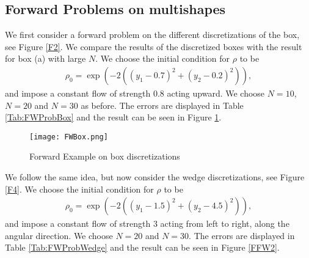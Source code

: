 \subsection*{Forward Problems on multishapes}
We first consider a forward problem on the different discretizations of the box, see Figure \ref{F2}. We compare the results of the discretized boxes with the result for box (a) with large $N$.
We choose the initial condition for $\rho$ to be
\begin{align*}
	\rho_0 = \exp(-2((y_1 - 0.7 )^2 + (y_2 - 0.2)^2)),
\end{align*}
and impose a constant flow of strength $0.8$ acting upward.
We choose $N = 10$, $N = 20$ and $N = 30$ as before. The errors are displayed in Table \ref{Tab:FWProbBox} and the result can be seen in Figure \ref{FFW1}. 
%
\begin{figure}[h]
	\centering
	\texttt{[image: FWBox.png]}
	\caption{Forward Example on box discretizations} 
	\label{FFW1}
\end{figure}


We follow the same idea, but now consider the wedge discretizations, see Figure \ref{F4}. We choose the initial condition for $\rho$ to be
\begin{align*}
	\rho_0 = \exp(-2((y_1 - 1.5 )^2 + (y_2 - 4.5)^2)),
\end{align*}
and impose a constant flow of strength $3$ acting from left to right, along the angular direction.
We choose $N = 20$ and $N = 30$. The errors are displayed in Table \ref{Tab:FWProbWedge} and the result can be seen in Figure \ref{FFW2}. 

